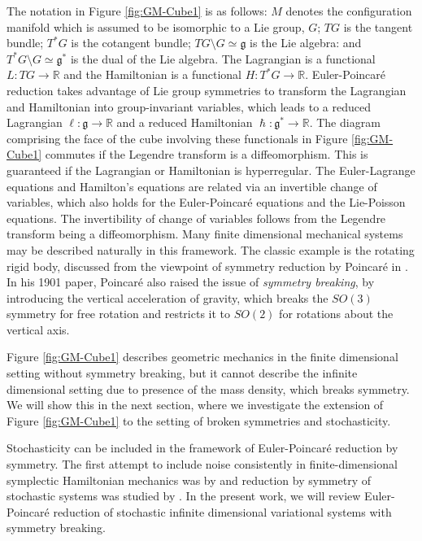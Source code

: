 \documentclass[11pt, oneside]{article}   	%
\numberwithin{equation}{section}
\theoremstyle{plain}
\theoremstyle{definition}
\theoremstyle{remark}
\newcommand{\<}{\langle}
\renewcommand{\>}{\rangle}
\begin{document}
The notation in Figure \ref{fig:GM-Cube1} is as follows: $M$ denotes the configuration manifold which is assumed to be isomorphic to a Lie group, $G$; $TG$ is the tangent bundle; $T^*G$ is the cotangent bundle; $TG\setminus G \simeq \mathfrak{g}$ is the Lie algebra: and $T^*G\setminus G\simeq \mathfrak{g}^*$ is the dual of the Lie algebra. The Lagrangian is a functional $L:TG\to\mathbb{R}$ and the Hamiltonian is a functional $H:T^*G\to\mathbb{R}$. Euler-Poincar\'e reduction takes advantage of Lie group symmetries to transform the Lagrangian and Hamiltonian into group-invariant variables, which leads to a reduced Lagrangian $\ell:\mathfrak{g}\to\mathbb{R}$ and a reduced Hamiltonian $\hslash:\mathfrak{g}^*\to\mathbb{R}$. The diagram comprising the face of the cube involving these functionals in Figure \ref{fig:GM-Cube1} commutes if the Legendre transform is a diffeomorphism. This is guaranteed if the Lagrangian or Hamiltonian is hyperregular. The Euler-Lagrange equations and Hamilton's equations are related via an invertible change of variables, which also holds for the Euler-Poincar\'e equations and the Lie-Poisson equations. The invertibility of change of variables follows from the Legendre transform being a diffeomorphism. Many finite dimensional mechanical systems may be described naturally in this framework. The classic example is the rotating rigid body, discussed from the viewpoint of symmetry reduction by Poincar\'e in \cite{poincare1901forme}. In his 1901 paper, Poincar\'e also raised the issue of \emph{symmetry breaking}, by introducing the vertical acceleration of gravity, which breaks the  $SO(3)$  symmetry for free rotation and restricts it to  $SO(2)$ for rotations about the vertical axis.  


Figure \ref{fig:GM-Cube1} describes geometric mechanics in the finite dimensional setting without symmetry breaking, but it cannot describe the infinite dimensional setting due to presence of the mass density, which breaks symmetry. We will show this in the next section, where we investigate the extension of Figure \ref{fig:GM-Cube1} to the setting of broken symmetries and stochasticity. 

Stochasticity can be included in the framework of Euler-Poincar\'e reduction by symmetry. The first attempt to include noise consistently in finite-dimensional symplectic Hamiltonian mechanics was by \cite{bismut1982mecanique} and reduction by symmetry of stochastic systems was studied by \cite{lazaro2008stochastic}. In the present work, we will review Euler-Poincar\'e reduction of stochastic infinite dimensional variational systems with symmetry breaking. 
\end{document}
